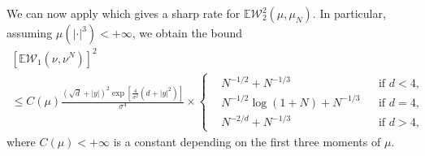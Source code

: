 \documentclass[final]{siamart171218}
\newcommand{\mbb}{\mathbb}
\newcommand{\EE}{\mbb{E}}
\newcommand{\W}{\mathcal{W}}
\begin{document}
We can now apply \cite[Thm.~1]{fournier2015rate} which gives a sharp 
rate for $\EE \W^2_2(\mu, \mu_N)$. In particular, assuming $\mu( | \cdot |^3)< + \infty$, we obtain the bound 
\begin{multline*}
    \left[ \EE \W_1(\nu, \nu^N) \right]^2 \\
    \le C(\mu) \frac{(\sqrt{d}+|y|)^2\exp\left[\frac 4{\sigma^2}\left(d +|y|^2\right)\right]}{\sigma^4}
    \times \left\{ 
    \begin{aligned}
      & N^{-1/2} + N^{-1/3} && \text{if } d < 4,\\ 
      & N^{-1/2} \log(1 + N) + N^{-1/3} && \text{if } d = 4, \\ 
      & N^{-2/d} + N^{-1/3}&& \text{if } d > 4,
    \end{aligned}
    \right.
\end{multline*}
where $C(\mu) <+\infty$ is a constant depending on the first three moments of $\mu$.
\end{document}
